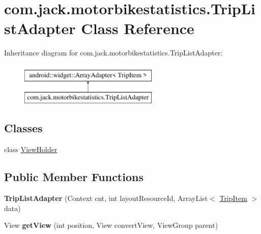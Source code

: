 \hypertarget{classcom_1_1jack_1_1motorbikestatistics_1_1_trip_list_adapter}{}\section{com.\+jack.\+motorbikestatistics.\+Trip\+List\+Adapter Class Reference}
\label{classcom_1_1jack_1_1motorbikestatistics_1_1_trip_list_adapter}
Inheritance diagram for com.\+jack.\+motorbikestatistics.\+Trip\+List\+Adapter\+:\begin{figure}[H]
\begin{center}
\leavevmode
\includegraphics[height=2.000000cm]{classcom_1_1jack_1_1motorbikestatistics_1_1_trip_list_adapter}
\end{center}
\end{figure}
\subsection*{Classes}
\begin{DoxyCompactItemize}
\item 
class \hyperlink{classcom_1_1jack_1_1motorbikestatistics_1_1_trip_list_adapter_1_1_view_holder}{View\+Holder}
\end{DoxyCompactItemize}
\subsection*{Public Member Functions}
\begin{DoxyCompactItemize}
\item 
\mbox{\label{classcom_1_1jack_1_1motorbikestatistics_1_1_trip_list_adapter_ace5ca232bac9a2a6e0d1b61e88b35546}} 
{\bfseries Trip\+List\+Adapter} (Context cnt, int layout\+Resource\+Id, Array\+List$<$ \hyperlink{classcom_1_1jack_1_1motorbikestatistics_1_1_trip_item}{Trip\+Item} $>$ data)
\item 
\mbox{\label{classcom_1_1jack_1_1motorbikestatistics_1_1_trip_list_adapter_a1cfdc3feff28941d18e70ce0979d959d}} 
View {\bfseries get\+View} (int position, View convert\+View, View\+Group parent)
\end{DoxyCompactItemize}
